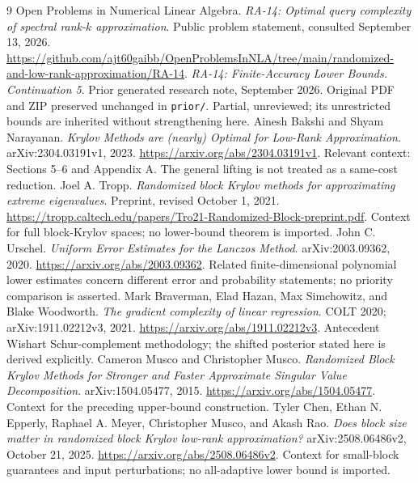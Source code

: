 \documentclass[11pt]{article}
\theoremstyle{definition}
\begin{document}
\begingroup\small\raggedright
\begin{thebibliography}{9}
 Open Problems in Numerical Linear Algebra. \emph{RA-14: Optimal query complexity of spectral rank-$k$ approximation}. Public problem statement, consulted September 13, 2026. \url{https://github.com/ajt60gaibb/OpenProblemsInNLA/tree/main/randomized-and-low-rank-approximation/RA-14}.
 \emph{RA-14: Finite-Accuracy Lower Bounds. Continuation 5}. Prior generated research note, September 2026. Original PDF and ZIP preserved unchanged in \texttt{prior/}. Partial, unreviewed; its unrestricted bounds are inherited without strengthening here.
 Ainesh Bakshi and Shyam Narayanan. \emph{Krylov Methods are (nearly) Optimal for Low-Rank Approximation}. arXiv:2304.03191v1, 2023. \url{https://arxiv.org/abs/2304.03191v1}. Relevant context: Sections 5--6 and Appendix A. The general lifting is not treated as a same-cost reduction.
 Joel A. Tropp. \emph{Randomized block Krylov methods for approximating extreme eigenvalues}. Preprint, revised October 1, 2021. \url{https://tropp.caltech.edu/papers/Tro21-Randomized-Block-preprint.pdf}. Context for full block-Krylov spaces; no lower-bound theorem is imported.
 John C. Urschel. \emph{Uniform Error Estimates for the Lanczos Method}. arXiv:2003.09362, 2020. \url{https://arxiv.org/abs/2003.09362}. Related finite-dimensional polynomial lower estimates concern different error and probability statements; no priority comparison is asserted.
 Mark Braverman, Elad Hazan, Max Simchowitz, and Blake Woodworth. \emph{The gradient complexity of linear regression}. COLT 2020; arXiv:1911.02212v3, 2021. \url{https://arxiv.org/abs/1911.02212v3}. Antecedent Wishart Schur-complement methodology; the shifted posterior stated here is derived explicitly.
 Cameron Musco and Christopher Musco. \emph{Randomized Block Krylov Methods for Stronger and Faster Approximate Singular Value Decomposition}. arXiv:1504.05477, 2015. \url{https://arxiv.org/abs/1504.05477}. Context for the preceding upper-bound construction.
 Tyler Chen, Ethan N. Epperly, Raphael A. Meyer, Christopher Musco, and Akash Rao. \emph{Does block size matter in randomized block Krylov low-rank approximation?} arXiv:2508.06486v2, October 21, 2025. \url{https://arxiv.org/abs/2508.06486v2}. Context for small-block guarantees and input perturbations; no all-adaptive lower bound is imported.
\end{thebibliography}
\endgroup
\end{document}
